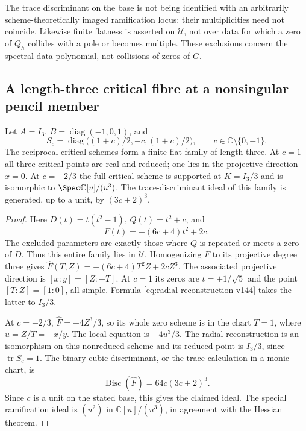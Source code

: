 The trace discriminant on the base is not being identified with an
arbitrarily scheme-theoretically imaged ramification locus: their
multiplicities need not coincide.  Likewise finite flatness is asserted
on \(\mathscr U\), not over data for which a zero of \(Q_h\)
collides with a pole or becomes multiple.  These exclusions concern
the spectral data polynomial, not collisions of zeros of \(G\).

\subsection{A length-three critical fibre at a nonsingular pencil member}
\begin{proposition}
\label{prop:triple-critical-v144}
Let \(A=I_3\), \(B=\operatorname{diag}(-1,0,1)\), and
\[
 S_c=\operatorname{diag}\bigl((1+c)/2,-c,(1+c)/2\bigr),
       \qquad c\in\mathbb C\setminus\{0,-1\}.
\]
The reciprocal critical schemes form a finite flat family of length
three.  At \(c=1\) all three critical points are real and reduced;
one lies in the projective direction \(x=0\).  At \(c=-2/3\)
the full critical scheme is supported at \(K=I_3/3\) and is
isomorphic to \(\Spec\mathbb C[u]/(u^3)\).  The trace-discriminant
ideal of this family is generated, up to a unit, by
\((3c+2)^3\).
\end{proposition}
\begin{proof}
Here \(D(t)=t(t^2-1)\), \(Q(t)=t^2+c\), and
\begin{equation}\label{eq:triple-score-v144}
                F(t)=-(6c+4)t^2+2c.
\end{equation}
The excluded parameters are exactly those where \(Q\) is repeated
or meets a zero of \(D\).  Thus this entire family lies in
\(\mathscr U\).  Homogenizing \(F\) to its projective degree
three gives
\(\widehat F(T,Z)=-(6c+4)T^2Z+2cZ^3\).
The associated projective direction is \([x:y]=[Z:-T]\).
At \(c=1\) its zeros are \(t=\pm1/\sqrt5\) and the point
\([T:Z]=[1:0]\), all simple.  Formula
\eqref{eq:radial-reconstruction-v144} takes the latter to \(I_3/3\).

At \(c=-2/3\), \(\widehat F=-4Z^3/3\), so its whole
zero scheme is in the chart \(T=1\), where \(u=Z/T=-x/y\).
The local equation is \(-4u^3/3\).  The radial reconstruction is
an isomorphism on this nonreduced scheme and its reduced point is
\(I_3/3\), since \(\operatorname{tr}S_c=1\).
The binary cubic discriminant, or the trace calculation in a monic
chart, is
\begin{equation}\label{eq:triple-discriminant-v144}
                 \operatorname{Disc}(\widehat F)
                       =64c(3c+2)^3.
\end{equation}
Since \(c\) is a unit on the stated base, this gives the claimed
ideal.  The special ramification ideal is \((u^2)\) in
\(\mathbb C[u]/(u^3)\), in agreement with the Hessian theorem.
\end{proof}

